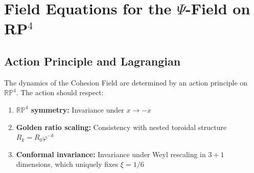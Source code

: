 \section{Field Equations for the $\Psi$-Field on RP$^4$}

\subsection{Action Principle and Lagrangian}

The dynamics of the Cohesion Field are determined by an action principle on $\mathbb{RP}^4$. The action should respect:

\begin{enumerate}
\item \textbf{$\mathbb{RP}^4$ symmetry:} Invariance under $x \to -x$
\item \textbf{Golden ratio scaling:} Consistency with nested toroidal structure $R_k = R_0\varphi^{-k}$
\item \textbf{Conformal invariance:} Invariance under Weyl rescaling in $3+1$ dimensions, which uniquely fixes $\xi = 1/6$
\end{enumerate}

